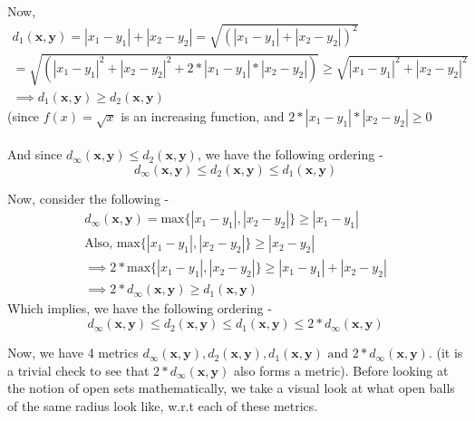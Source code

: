 \begin{frame}
    Now,
    \begin{gather*}
        d_1(\boldsymbol{x}, \boldsymbol{y}) = |x_1 - y_1| + |x_2 - y_2| = \sqrt{\left(|x_1 - y_1| + |x_2 - y_2|\right)^2} \\
        = \sqrt{\left(|x_1 - y_1|^2 + |x_2 - y_2|^2 + 2*|x_1 - y_1|*|x_2 - y_2|\right)} \geq \sqrt{|x_1 - y_1|^2 + |x_2 - y_2|^2} \\
        \implies d_1(\boldsymbol{x}, \boldsymbol{y}) \geq d_2(\boldsymbol{x}, \boldsymbol{y})
    \end{gather*}
    (since \( f(x) = \sqrt{x} \) is an increasing function, and \( 2*|x_1 - y_1|*|x_2 - y_2| \geq 0 \) \\\\
    And since \(d_\infty(\boldsymbol{x}, \boldsymbol{y}) \leq d_2(\boldsymbol{x}, \boldsymbol{y})\), we have the following ordering -
    \begin{equation*}
        d_\infty(\boldsymbol{x}, \boldsymbol{y}) \leq d_2(\boldsymbol{x}, \boldsymbol{y}) \leq d_1(\boldsymbol{x}, \boldsymbol{y})
    \end{equation*}
\end{frame}

\begin{frame}
    Now, consider the following - 
    \begin{gather*}
        d_\infty(\boldsymbol{x}, \boldsymbol{y}) = \text{max} \{|x_1 - y_1|, |x_2 - y_2|\} \geq |x_1 - y_1| \\
        \text{Also, } \text{max} \{|x_1 - y_1|, |x_2 - y_2|\} \geq |x_2 - y_2| \\
        \implies 2*\text{max} \{|x_1 - y_1|, |x_2 - y_2|\} \geq |x_1 - y_1| + |x_2 - y_2| \\
        \implies 2*d_\infty(\boldsymbol{x}, \boldsymbol{y}) \geq d_1(\boldsymbol{x}, \boldsymbol{y})
    \end{gather*}
    Which implies, we have the following ordering -
    \begin{equation*}
        d_\infty(\boldsymbol{x}, \boldsymbol{y}) \leq d_2(\boldsymbol{x}, \boldsymbol{y}) \leq d_1(\boldsymbol{x}, \boldsymbol{y}) \leq 2*d_\infty(\boldsymbol{x}, \boldsymbol{y})
    \end{equation*}
\end{frame}

\begin{frame}
    Now, we have 4 metrics \( d_\infty(\boldsymbol{x}, \boldsymbol{y}), d_2(\boldsymbol{x}, \boldsymbol{y}), d_1(\boldsymbol{x}, \boldsymbol{y}) \text{ and } 2*d_\infty(\boldsymbol{x}, \boldsymbol{y})\). (it is a trivial check to see that $2*d_\infty(\boldsymbol{x}, \boldsymbol{y})$ also forms a metric). Before looking at the notion of open sets mathematically, we take a visual look at what open balls of the same radius look like, w.r.t each of these metrics. \\
    \begin{figure}
        \hspace{8em}
        \scalebox{1.2}{}
    \end{figure}
\end{frame}

